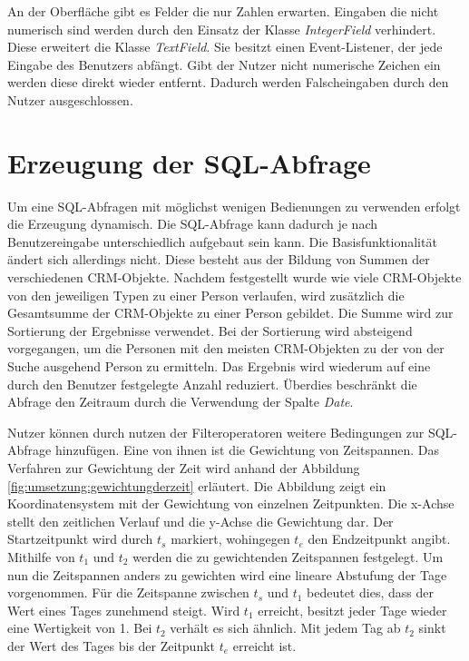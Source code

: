 An der Oberfläche gibt es Felder die nur Zahlen erwarten. Eingaben die nicht numerisch sind werden durch den Einsatz der Klasse \textit{IntegerField} verhindert. Diese erweitert die Klasse \textit{TextField}. Sie besitzt einen Event-Listener, der jede Eingabe des Benutzers abfängt. Gibt der Nutzer nicht numerische Zeichen ein werden diese direkt wieder entfernt. Dadurch werden Falscheingaben durch den Nutzer ausgeschlossen.

\section{Erzeugung der SQL-Abfrage}

Um eine SQL-Abfragen mit möglichst wenigen Bedienungen zu verwenden erfolgt die Erzeugung dynamisch. Die SQL-Abfrage kann dadurch je nach Benutzereingabe unterschiedlich aufgebaut sein kann. Die Basisfunktionalität ändert sich allerdings nicht. Diese besteht aus der Bildung von Summen der verschiedenen CRM-Objekte. Nachdem festgestellt wurde wie viele CRM-Objekte von den jeweiligen Typen zu einer Person verlaufen, wird zusätzlich die Gesamtsumme der CRM-Objekte zu einer Person gebildet. Die Summe wird zur Sortierung der Ergebnisse verwendet. Bei der Sortierung wird absteigend vorgegangen, um die Personen mit den meisten CRM-Objekten zu der von der Suche ausgehend Person zu ermitteln. Das Ergebnis wird wiederum auf eine durch den Benutzer festgelegte Anzahl reduziert. Überdies beschränkt die Abfrage den Zeitraum durch die Verwendung der Spalte \textit{Date}.

Nutzer können durch nutzen der Filteroperatoren weitere Bedingungen zur SQL-Abfrage hinzufügen. Eine von ihnen ist die Gewichtung von Zeitspannen. Das Verfahren zur Gewichtung der Zeit wird anhand der Abbildung \ref{fig:umsetzung:gewichtungderzeit} erläutert. Die Abbildung zeigt ein Koordinatensystem mit der Gewichtung von einzelnen Zeitpunkten. Die x-Achse stellt den zeitlichen Verlauf und die y-Achse die Gewichtung dar. Der Startzeitpunkt wird durch $t_{s}$ markiert, wohingegen $t_{e}$ den Endzeitpunkt angibt. Mithilfe von $t_1$ und $t_2$ werden die zu gewichtenden Zeitspannen festgelegt. Um nun die Zeitspannen anders zu gewichten wird eine lineare Abstufung der Tage vorgenommen. Für die Zeitspanne zwischen $t_{s}$ und $t_1$ bedeutet dies, dass der Wert eines Tages zunehmend steigt. Wird $t_1$ erreicht, besitzt jeder Tage wieder eine Wertigkeit von 1. Bei $t_2$ verhält es sich ähnlich. Mit jedem Tag ab $t_2$ sinkt der Wert des Tages bis der Zeitpunkt $t_{e}$ erreicht ist.

